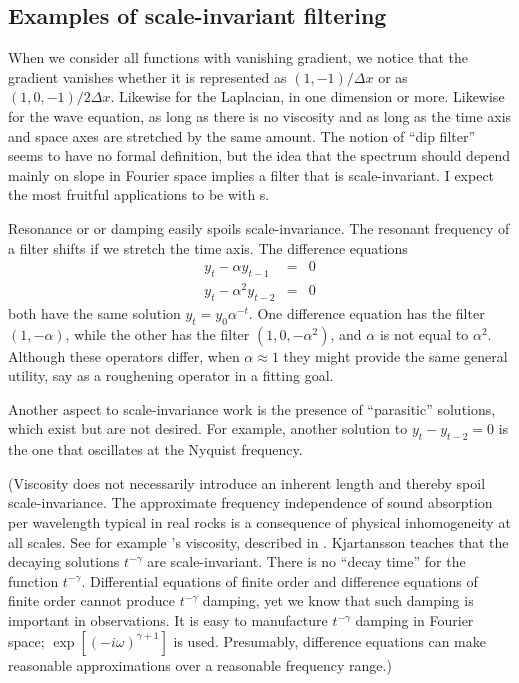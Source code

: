 \subsection{Examples of scale-invariant filtering}
When we consider all functions with vanishing gradient,
we notice that the gradient vanishes whether it is represented as
$(1,-1)/\Delta x$ or as
$(1,0,-1)/2\Delta x$.
Likewise for the Laplacian, in one dimension or more.
Likewise for the wave equation, as long as there is no viscosity
and as long as the time axis and space axes are stretched
by the same amount.
The notion of ``dip filter'' seems to have no formal definition,
but the idea that the spectrum should depend mainly on slope
in Fourier space implies a filter that is scale-invariant.
I expect
the most fruitful applications
to be with s.

\par
Resonance or  or damping easily spoils scale-invariance.
The resonant frequency of a filter shifts if we stretch the time axis.
The difference equations
\begin{eqnarray}
y_t - \alpha   y_{t-1} &=& 0 \\
y_t - \alpha^2 y_{t-2} &=& 0    \label{eqn:sparsedecay}
\end{eqnarray}
both have the same solution $y_t = y_0 \alpha^{-t}$.
One difference equation has the filter
$(1,-\alpha)$,
while the other has the filter
$(1,0,-\alpha^2)$,
and $\alpha$ is not equal to $\alpha^2$.
Although these operators differ,
when $\alpha \approx 1$ they might provide the same general utility,
say as a roughening operator in a fitting goal.

\par
Another aspect to scale-invariance work is the presence
of ``parasitic'' solutions,
which exist but are not desired.
For example, another solution to $y_t -  y_{t-2}=0$
is the one that oscillates at the Nyquist frequency.

\par
(Viscosity does not necessarily introduce an inherent length
and thereby spoil scale-invariance.
The approximate frequency independence of sound absorption per wavelength
typical in real rocks is a consequence
of physical inhomogeneity at all scales.
See for example 's  viscosity,
described in .
Kjartansson teaches that
the decaying solutions $t^{-\gamma}$ are scale-invariant.
There is no ``decay time'' for the function $t^{-\gamma}$.
Differential equations of finite order and
difference equations of finite order cannot produce
$t^{-\gamma}$ damping,
yet we know that such damping is important in observations.
It is easy to manufacture
$t^{-\gamma}$ damping
in Fourier space;
$\exp[(-i\omega)^{\gamma+1}]$ is used.
Presumably,
difference equations can make reasonable approximations
over a reasonable frequency range.)

